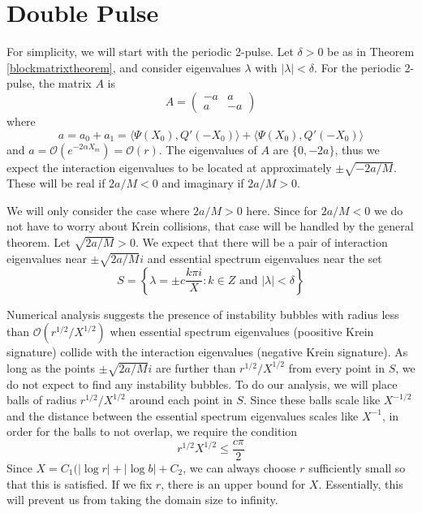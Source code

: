 \documentclass[thesis.tex]{subfiles}
\begin{document}
\chapter{Double Pulse}

For simplicity, we will start with the periodic 2-pulse. Let $\delta > 0$ be as in Theorem \ref{blockmatrixtheorem}, and consider eigenvalues $\lambda$ with $|\lambda| < \delta$. For the periodic 2-pulse, the matrix $A$ is
\[
A = \begin{pmatrix}
-a & a \\
a & -a
\end{pmatrix}
\]
where
\[
a = a_0 + a_1 = \langle \Psi(X_0), Q'(-X_0) \rangle + \langle \Psi(X_0), Q'(-X_0) \rangle
\]
and $a = \mathcal{O}(e^{-2\alpha X_m}) = \mathcal{O}(r)$. The eigenvalues of $A$ are $\{0, -2a\}$, thus we expect the interaction eigenvalues to be located at approximately $\pm \sqrt{-2a/M}$. These will be real if $2a/M < 0$ and imaginary if $2a/M > 0$. 

We will only consider the case where $2a/M > 0$ here. Since for $2a/M < 0$ we do not have to worry about Krein collisions, that case will be handled by the general theorem. Let $\sqrt{2a/M} > 0$. We expect that there will be a pair of interaction eigenvalues near $\pm \sqrt{2a/M} i$ and essential spectrum eigenvalues near the set 
\[
S = \left\{ \lambda = \pm c \frac{k \pi i}{X} : k \in Z \text{ and }|\lambda| < \delta  \right\} 
\]

Numerical analysis suggests the presence of instability bubbles with radius less than $\mathcal{O}(r^{1/2}/X^{1/2})$ when essential spectrum eigenvalues (poositive Krein signature) collide with the interaction eigenvalues (negative Krein signature). As long as the points $\pm \sqrt{2a/M} i$ are further than $r^{1/2}/X^{1/2}$ from every point in $S$, we do not expect to find any instability bubbles. To do our analysis, we will place balls of radius $r^{1/2}/X^{1/2}$ around each point in $S$. Since these balls scale like $X^{-1/2}$ and the distance between the essential spectrum eigenvalues scales like $X^{-1}$, in order for the balls to not overlap, we require the condition
\begin{equation}\label{rXcondition}
r^{1/2}X^{1/2} \leq \frac{c \pi}{2}
\end{equation}
Since $X = C_1 ( |\log r| + |\log b| + C_2$, we can always choose $r$ sufficiently small so that this is satisfied. If we fix $r$, there is an upper bound for $X$. Essentially, this will prevent us from taking the domain size to infinity.
\end{document}
